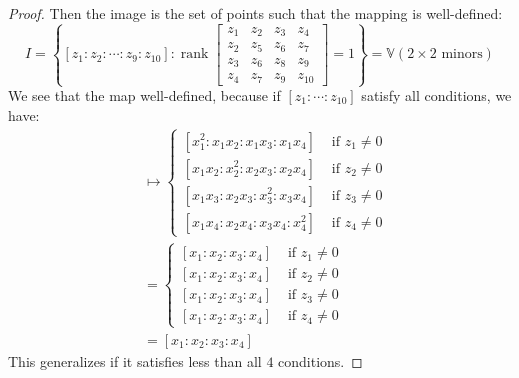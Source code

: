 \documentclass{article}
\begin{document}
\begin{itemize}
\begin{proof}
                Then the image is the set of points such that the mapping is well-defined:
                    \begin{equation*}
                        I = \left\{[z_{1} : z_{2} : \cdots : z_{9} : z_{10}] : \mathop{rank}\begin{bmatrix}
                            z_{1} & z_{2} & z_{3} & z_{4}  \\
                            z_{2} & z_{5} & z_{6} & z_{7}  \\
                            z_{3} & z_{6} & z_{8} & z_{9}  \\
                            z_{4} & z_{7} & z_{9} & z_{10}   
                        \end{bmatrix} = 1\right\} = \mathbb{V}(2 \times 2 \text{ minors})
                    \end{equation*}
                We see that the map well-defined, because if $[z_{1} : \cdots : z_{10}]$ satisfy all conditions, we have:
                    \begin{align*}
                        [z_{1} : \cdots : z_{10}] &\mapsto \begin{cases}
                            [x_{1}^{2} : x_{1}x_{2} : x_{1}x_{3} : x_{1}x_{4}] &\text{ if } z_{1} \neq 0 \\
                            [x_{1}x_{2} : x_{2}^{2} : x_{2}x_{3} : x_{2}x_{4}] &\text{ if } z_{2} \neq 0 \\
                            [x_{1}x_{3} : x_{2}x_{3} : x_{3}^{2} : x_{3}x_{4}] &\text{ if } z_{3} \neq 0 \\
                            [x_{1}x_{4} : x_{2}x_{4} : x_{3}x_{4} : x_{4}^{2}] &\text{ if } z_{4} \neq 0   
                        \end{cases}                   \\
                                                  &=       \begin{cases}
                                                      [x_{1} : x_{2} : x_{3} : x_{4}] &\text{ if } z_{1} \neq 0 \\
                                                      [x_{1} : x_{2} : x_{3} : x_{4}] &\text{ if } z_{2} \neq 0 \\
                                                      [x_{1} : x_{2} : x_{3} : x_{4}] &\text{ if } z_{3} \neq 0 \\
                                                      [x_{1} : x_{2} : x_{3} : x_{4}] &\text{ if } z_{4} \neq 0   
                                                  \end{cases}                   \\
                                                  &=       [x_{1} : x_{2} : x_{3} : x_{4}]   
                    \end{align*}
                This generalizes if it satisfies less than all $4$ conditions.


\end{proof}
\end{itemize}
\end{document}
